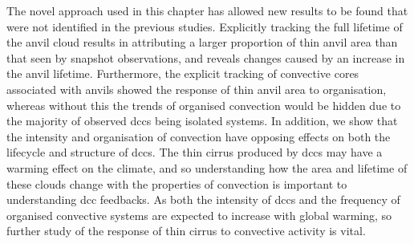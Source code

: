  
The novel approach used in this chapter has allowed new results to be found that were not identified in the previous studies.
Explicitly tracking the full lifetime of the anvil cloud results in attributing a larger proportion of thin anvil area than that seen by snapshot observations, and reveals changes caused by an increase in the anvil lifetime.
Furthermore, the explicit tracking of convective cores associated with anvils showed the response of thin anvil area to organisation, whereas without this the trends of organised convection would be hidden due to the majority of observed \acrshort{dcc}s being isolated systems.
In addition, we show that the intensity and organisation of convection have opposing effects on both the lifecycle and structure of \acrshort{dcc}s. 
The thin cirrus produced by \acrshort{dcc}s may have a warming effect on the climate, and so understanding how the area and lifetime of these clouds change with the properties of convection is important to understanding \acrshort{dcc} feedbacks. 
As both the intensity of \acrshort{dcc}s and the frequency of organised convective systems are expected to increase with global warming, so further study of the response of thin cirrus to convective activity is vital.


